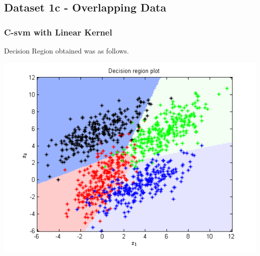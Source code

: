 \documentclass{article}
\begin{document}
\subsection{Dataset 1c - Overlapping Data}



\subsubsection{C-svm with Linear Kernel}

Decision Region obtained was as follows.
\begin{center}
\includegraphics[scale=1]{Classification/1c/c_linear/dec}
\end{center}
\end{document}
